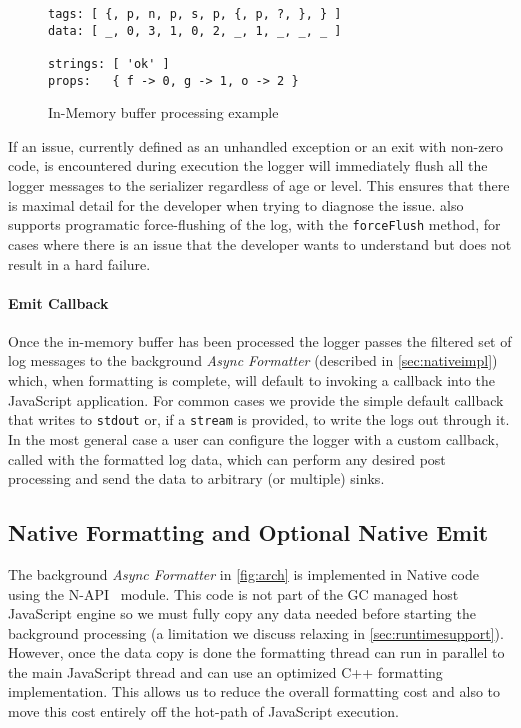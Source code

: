 \begin{figure}
    \centering
\begin{lstlisting}[basicstyle=\small,numbers=none]
tags: [ {, p, n, p, s, p, {, p, ?, }, } ]
data: [ _, 0, 3, 1, 0, 2, _, 1, _, _, _ ]

strings: [ 'ok' ]
props:   { f -> 0, g -> 1, o -> 2 }

\end{lstlisting}
    \caption{In-Memory buffer processing example}
    \label{fig:inmemory}
\end{figure}

If an issue, currently defined as an unhandled exception or an exit with non-zero code, 
is encountered during execution the logger will immediately flush all the logger 
messages to the serializer regardless of age or level. This ensures that there is maximal 
detail for the developer when trying to diagnose the issue. \projn also supports 
programatic force-flushing of the log, with the \texttt{forceFlush} method, for cases where there 
is an issue that the developer wants to understand but does not result in a hard failure. 

\paragraph{Emit Callback}
\noindent
Once the in-memory buffer has been processed the logger passes the filtered set of 
log messages to the background \emph{Async Formatter} (described in \autoref{sec:nativeimpl}) 
which, when formatting is complete, will default to invoking a callback into the 
JavaScript application. For common cases we provide the simple default callback that 
writes to \texttt{stdout} or, if a \texttt{stream} is provided, to write the logs out through 
it. In the most general case a user can configure the logger with a custom callback, 
called with the formatted log data, which can perform any desired post processing and 
send the data to arbitrary (or multiple) sinks.

\subsection{Native Formatting and Optional Native Emit}
\label{sec:nativeimpl}
The background \emph{Async Formatter} in \autoref{fig:arch} 
is implemented in Native code using the N-API~\cite{NAPI} module. This
code is not part of the GC managed host JavaScript engine so we must fully copy any data needed before starting 
the background processing (a limitation we discuss relaxing in \autoref{sec:runtimesupport}). 
However, once the data copy is done the formatting thread can run in parallel 
to the main JavaScript thread and can use an optimized C++ formatting implementation. This 
allows us to reduce the overall formatting cost and also to move this cost 
entirely off the hot-path of JavaScript execution.

